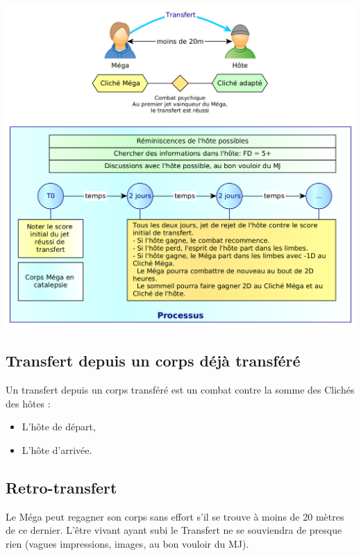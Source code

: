 \documentclass[11pt]{article}
\begin{document}
\begin{center}
\includegraphics[scale=.35]{06-transfert}
\end{center}

\subsection{Transfert depuis un corps déjà transféré}

Un transfert depuis un corps transféré est un combat contre la somme des Clichés des hôtes :
\begin{itemize}
\item L'hôte de départ,
\item L'hôte d'arrivée.
\end{itemize}

\subsection{Retro-transfert}

Le Méga peut regagner son corps sans effort s'il se trouve à moins de 20 mètres de ce dernier. L'être vivant ayant subi le Transfert ne se souviendra de presque rien (vagues impressions, images, au bon vouloir du MJ).
\end{document}
